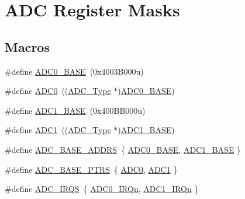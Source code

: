\hypertarget{group___a_d_c___register___masks}{}\section{A\+DC Register Masks}
\label{group___a_d_c___register___masks}
\subsection*{Macros}
\begin{DoxyCompactItemize}
\item 
\#define \mbox{\hyperlink{group___a_d_c___register___masks_ga0aa6c0c068af7a61c770bc6d4322d63e}{A\+D\+C0\+\_\+\+B\+A\+SE}}~(0x4003\+B000u)
\item 
\#define \mbox{\hyperlink{group___a_d_c___register___masks_ga0d2ea0f4a8dd17bf08e69d05deacbcb5}{A\+D\+C0}}~((\mbox{\hyperlink{struct_a_d_c___type}{A\+D\+C\+\_\+\+Type}} $\ast$)\mbox{\hyperlink{group___a_d_c___register___masks_ga0aa6c0c068af7a61c770bc6d4322d63e}{A\+D\+C0\+\_\+\+B\+A\+SE}})
\item 
\#define \mbox{\hyperlink{group___a_d_c___register___masks_ga695c9a2f892363a1c942405c8d351b91}{A\+D\+C1\+\_\+\+B\+A\+SE}}~(0x400\+B\+B000u)
\item 
\#define \mbox{\hyperlink{group___a_d_c___register___masks_ga90d2d5c526ce5c0a551f533eccbee71a}{A\+D\+C1}}~((\mbox{\hyperlink{struct_a_d_c___type}{A\+D\+C\+\_\+\+Type}} $\ast$)\mbox{\hyperlink{group___a_d_c___register___masks_ga695c9a2f892363a1c942405c8d351b91}{A\+D\+C1\+\_\+\+B\+A\+SE}})
\item 
\#define \mbox{\hyperlink{group___a_d_c___register___masks_gaf635223a5796d02fc2f731139925696d}{A\+D\+C\+\_\+\+B\+A\+S\+E\+\_\+\+A\+D\+D\+RS}}~\{ \mbox{\hyperlink{group___a_d_c___register___masks_ga0aa6c0c068af7a61c770bc6d4322d63e}{A\+D\+C0\+\_\+\+B\+A\+SE}}, \mbox{\hyperlink{group___a_d_c___register___masks_ga695c9a2f892363a1c942405c8d351b91}{A\+D\+C1\+\_\+\+B\+A\+SE}} \}
\item 
\#define \mbox{\hyperlink{group___a_d_c___register___masks_gaaa8175a3a2f4efaceeed5bd26c0b2d3f}{A\+D\+C\+\_\+\+B\+A\+S\+E\+\_\+\+P\+T\+RS}}~\{ \mbox{\hyperlink{group___a_d_c___register___masks_ga0d2ea0f4a8dd17bf08e69d05deacbcb5}{A\+D\+C0}}, \mbox{\hyperlink{group___a_d_c___register___masks_ga90d2d5c526ce5c0a551f533eccbee71a}{A\+D\+C1}} \}
\item 
\#define \mbox{\hyperlink{group___a_d_c___register___masks_ga87c1a48633af604e5c7c6a64383398b9}{A\+D\+C\+\_\+\+I\+R\+QS}}~\{ \mbox{\hyperlink{group___interrupt__vector__numbers_gga666eb0caeb12ec0e281415592ae89083a08b6c660bfe015ac0842ca95510420eb}{A\+D\+C0\+\_\+\+I\+R\+Qn}}, \mbox{\hyperlink{group___interrupt__vector__numbers_gga666eb0caeb12ec0e281415592ae89083a34f5005b5e508c84906c6f951f31c1bb}{A\+D\+C1\+\_\+\+I\+R\+Qn}} \}
\end{DoxyCompactItemize}
